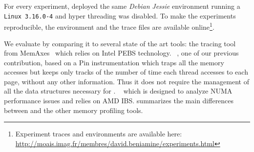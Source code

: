 For every experiment, deployed the same \emph{Debian} \emph{Jessie}
environment running a \texttt{Linux 3.16.0-4} and hyper threading was
disabled.
To make the experiments reproducible, the environment and the trace files are
available
online\footnote{Experiment traces and environments are available here:\\ \url{http://moais.imag.fr/membres/david.beniamine/experiments.html}}.

We evaluate \Moca by comparing it to several state of the art tools: \Mitos
the tracing tool from MemAxes~\cite{Gimenez14Dissecting} which relies on Intel
PEBS technology. 
\TABARNAC~\cite{Beniamine15TABARNACRR}, one of our previous contribution,
based on a Pin instrumentation which traps all the memory accesses but keeps
only tracks of the number of time each thread accesses to each page, without
any other information. Thus it does not require the management of all the data
structures necessary for \Moca.
\MemProf~\cite{Lachaize12MemProf} which is designed to analyze NUMA
performance issues and relies on AMD IBS.
 summarizes the main differences
between \Moca and the other memory profiling tools.

